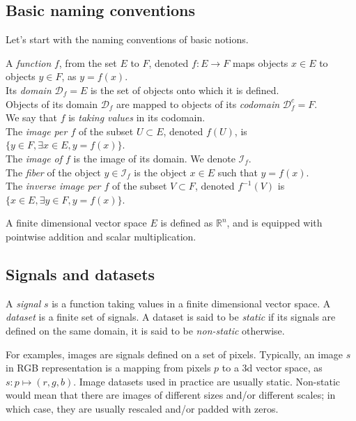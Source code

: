 \documentclass{article}
\newcommand{\domain}{\mathcal{D}}
\newcommand{\image}{\mathcal{I}}
\newcommand{\real}{\mathbb{R}}
\begin{document}
\subsection*{Basic naming conventions}

Let's start with the naming conventions of basic notions.

A \emph{function} $f$, from the set $E$ to $F$, denoted $f: E \rightarrow F$ maps objects $x \in E$ to objects $y \in F$, as $y = f(x)$.\\
Its \emph{domain} $\domain_f = E$ is the set of objects onto which it is defined.\\
Objects of its domain $\domain_f$ are mapped to objects of its \emph{codomain} $\domain_f^c= F$.\\
We say that $f$ is \emph{taking values} in its codomain.\\
The \emph{image per $f$} of the subset $U \subset E$, denoted $f(U)$, is $\{y \in F, \exists x \in E, y = f(x)\}$.\\
The \emph{image of $f$} is the image of its domain. We denote $\image_f$.\\
The \emph{fiber} of the object $y \in \image_f$ is the object $x \in E$ such that $y = f(x)$.\\
The \emph{inverse image per $f$} of the subset $V \subset F$, denoted $f^{-1}(V)$ is $\{x \in E, \exists y \in F, y = f(x)\}$.

A finite dimensional vector space $E$ is defined as $\real^n$, and is equipped with pointwise addition and scalar multiplication. %

\subsection*{Signals and datasets}

A \emph{signal} $s$ is a function taking values in a finite dimensional vector space.
A \emph{dataset} is a finite set of signals.
A dataset is said to be \emph{static} if its signals are defined on the same domain, it is said to be \emph{non-static} otherwise.

For examples, images are signals defined on a set of pixels. Typically, an image $s$ in RGB representation is a mapping from pixels $p$ to a 3d vector space, as $s: p \mapsto (r,g,b)$. Image datasets used in practice are usually static. Non-static would mean that there are images of different sizes and/or different scales; in which case, they are usually rescaled and/or padded with zeros.
\end{document}
